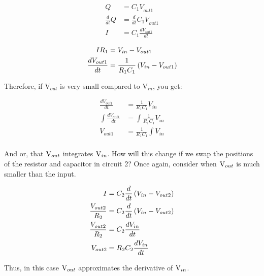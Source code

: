 \begin{equation} \label{cap2}
\begin{split}
{Q} &= {C_1V}_{out1}\\
\frac{d}{dt}{Q} &= \frac{d}{dt}{C_1V}_{out1} \\
{I} &= {C_1}\frac{d{V}_{out1}}{dt} \\
\end{split}
\end{equation}
\begin{equation} \label{cap3}
\begin{split}
{IR}_1 &= V_{in} - V_{out1} \\
\frac{d{V}_{out1}}{dt} &= \frac{1}{{R}_1 C_1}\left(V_{in} - V_{out1}\right)
\end{split}
\end{equation}\newline

Therefore, if V$_{out}$ is very small compared to V$_{in}$, you get: 

\begin{equation} \label{cap4}
\begin{split}
\frac{d{V}_{out1}}{dt} &= \frac{1}{{R}_1 C_1}V_{in}\\
\int \frac{d{V}_{out1}}{dt} &= \int \frac{1}{{R}_1 C_1}V_{in}\\
{V}_{out1} &= \frac{1}{{R}_1 C_1} \int V_{in}\\
\end{split}
\end{equation}

And or, that ${\rm V}_{out}$ integrates ${\rm V}_{in}$. How will this change if we swap the positions of the resistor and capacitor in circuit 2? Once again, consider when ${\rm V}_{out}$ is much smaller than the input. 

\begin{equation} \label{cap5}
\begin{split}
{I} &= {C_2}\frac{d}{dt} \left(V_{in} - V_{out2}\right)\\
{\frac{V_{out2}}{R_2}} &= {C_2}\frac{d}{dt} \left(V_{in} - V_{out2}\right)\\
{\frac{V_{out2}}{R_2}} &= {C_2}\frac{d V_{in}}{dt}\\
V_{out2} &= R_2{C_2}\frac{d V_{in}}{dt}\\
\end{split}
\end{equation}\newline

Thus, in this case ${\rm V}_{out}$ approximates the derivative of ${\rm V}_{in}$. 

